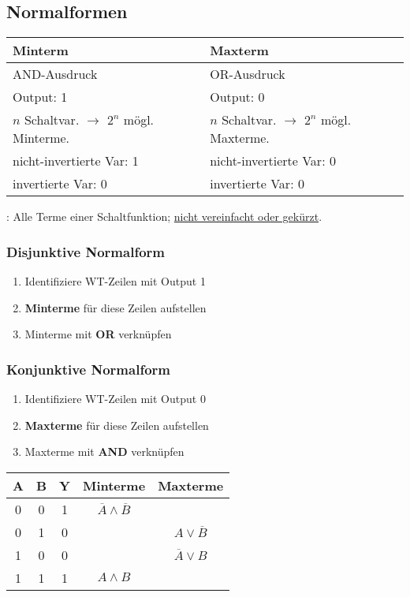 \subsection{Normalformen}
\begin{center}
    \small
    \renewcommand{\arraystretch}{1.5}
    \begin{tabular}{p{30mm} | p{30mm}}
        \textbf{Minterm} & \textbf{Maxterm}\\
        \hline
        AND-Ausdruck & OR-Ausdruck\\
        Output: 1 & Output: 0\\ 
        $n$ Schaltvar. $\rightarrow$ $2^n$ mögl. Minterme. & $n$ Schaltvar. $\rightarrow$ $2^n$ mögl. Maxterme.\\
        nicht-invertierte Var: 1 & nicht-invertierte Var: 0\\
        invertierte Var: 0 &invertierte Var: 0
    \end{tabular}
\end{center}
: Alle Terme einer Schaltfunktion; \underline{nicht vereinfacht oder gekürzt}.
\subsubsection{Disjunktive Normalform}
\begin{enumerate}
    \item Identifiziere WT-Zeilen mit Output 1
    \item \textbf{Minterme} für diese Zeilen aufstellen
    \item Minterme mit \textbf{OR} verknüpfen
\end{enumerate}
\subsubsection{Konjunktive Normalform}
\begin{enumerate}
    \item Identifiziere WT-Zeilen mit Output 0
    \item \textbf{Maxterme} für diese Zeilen aufstellen
    \item Maxterme mit \textbf{AND} verknüpfen
\end{enumerate}
\begin{center}
        \begin{tabular}{|c c|c|c|c|}
            \hline
            A & B & Y & Minterme & Maxterme\\
            \hline
            0 & 0 & 1 & $\overline{A} \land \overline{B}$ & \\
            0 & 1 & 0 & & $A \lor \overline{B}$\\
            1 & 0 & 0 & & $\overline{A} \lor B$\\
            1 & 1 & 1 & $A \land B$ & \\
            \hline
        \end{tabular}
\end{center}


